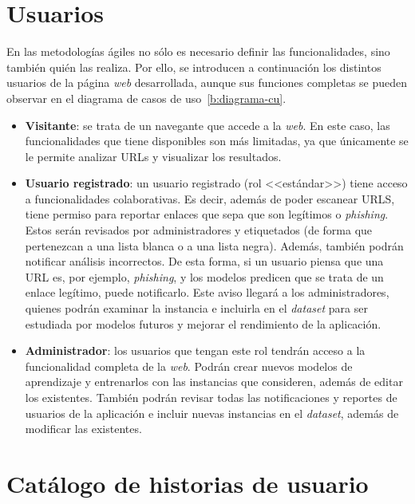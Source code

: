 \section{Usuarios}
\label{s:usuarios}

En las metodologías ágiles no sólo es necesario definir las funcionalidades, sino también quién las realiza. Por ello, se introducen a continuación los distintos usuarios de la página \textit{web} desarrollada, aunque sus funciones completas se pueden observar en el diagrama de casos de uso~\ref{b:diagrama-cu}.

\begin{itemize}
	\item \textbf{Visitante}: se trata de un navegante que accede a la \textit{web}. En este caso, las funcionalidades que tiene disponibles son más limitadas, ya que únicamente se le permite analizar URLs y visualizar los resultados.
	\item \textbf{Usuario registrado}: un usuario registrado (rol <<estándar>>) tiene acceso a funcionalidades colaborativas. Es decir, además de poder escanear URLS, tiene permiso para reportar enlaces que sepa que son legítimos o \textit{phishing}. Estos serán revisados por administradores y etiquetados (de forma que pertenezcan a una lista blanca o a una lista negra). Además, también podrán notificar análisis incorrectos. De esta forma, si un usuario piensa que una URL es, por ejemplo, \textit{phishing}, y los modelos predicen que se trata de un enlace legítimo, puede notificarlo. Este aviso llegará a los administradores, quienes podrán examinar la instancia e incluirla en el \textit{dataset} para ser estudiada por modelos futuros y mejorar el rendimiento de la aplicación.
	\item \textbf{Administrador}: los usuarios que tengan este rol tendrán acceso a la funcionalidad completa de la \textit{web}. Podrán crear nuevos modelos de aprendizaje y entrenarlos con las instancias que consideren, además de editar los existentes. También podrán revisar todas las notificaciones y reportes de usuarios de la aplicación e incluir nuevas instancias en el \textit{dataset}, además de modificar las existentes.
\end{itemize}

\section{Catálogo de historias de usuario}
\label{s:hu}


